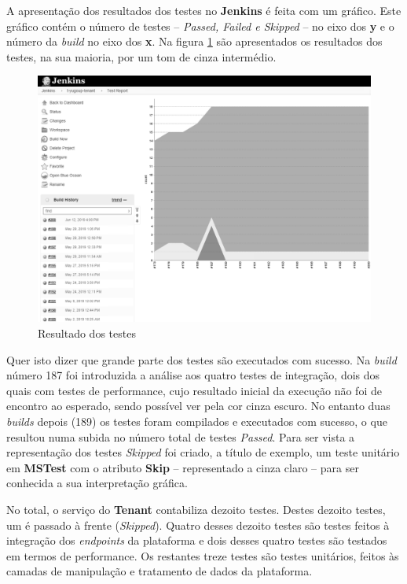 \hspace{1cm}A apresentação dos resultados dos testes no \textbf{Jenkins} é feita com um gráfico. Este gráfico contém o número de testes -- \textit{Passed, Failed e Skipped} -- no eixo dos \textbf{y} e o número da \textit{build} no eixo dos \textbf{x}. 
Na figura \ref{Fig:Fig70} são apresentados os resultados dos testes, na sua maioria, por um tom de cinza intermédio.

\begin{figure}[hbt!]
\centering
\includegraphics[width=0.9\linewidth]{Cap6/TenantTestResults.png}
\caption{Resultado dos testes}
\label{Fig:Fig70}
\end{figure}

Quer isto dizer que grande parte dos testes são executados com sucesso. Na \textit{build} número 187 foi introduzida a análise aos quatro testes de integração, dois dos quais com testes de performance, cujo resultado inicial da execução não foi de encontro ao esperado, sendo possível ver pela cor cinza escuro. No entanto duas \textit{builds} depois (189) os testes foram compilados e executados com sucesso, o que resultou numa subida no número total de testes \textit{Passed}. Para ser vista a representação dos testes \textit{Skipped} foi criado, a título de exemplo, um teste unitário em \textbf{MSTest} com o atributo \textbf{Skip} -- representado a cinza claro -- para ser conhecida a sua interpretação gráfica. 

\hspace{1cm}No total, o serviço do \textbf{Tenant} contabiliza dezoito testes. Destes dezoito testes, um é passado à frente (\textit{Skipped}). Quatro desses dezoito testes são testes feitos à integração dos \textit{endpoints} da plataforma e dois desses quatro testes são testados em termos de performance. Os restantes treze testes são testes unitários, feitos às camadas de manipulação e tratamento de dados da plataforma.

